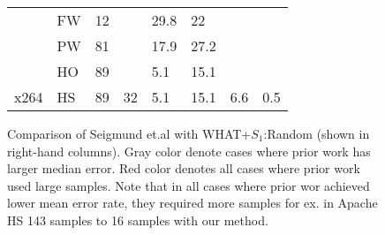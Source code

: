 \begin{figure*}[!t]
\begin{tabular}{|l|l|l|l|l|l|l|l|}
                                   & FW                              & 12                              &                                            & \cellcolor[HTML]{C0C0C0}29.8 & \cellcolor[HTML]{C0C0C0}22   &                       &                       \\ \cline{2-3} \cline{5-6}
                                   & PW                              & \cellcolor[HTML]{FD6864}81                              &                                            & \cellcolor[HTML]{C0C0C0}17.9 & \cellcolor[HTML]{C0C0C0}27.2 &                       &                       \\ \cline{2-3} \cline{5-6}
                                   & HO                              & \cellcolor[HTML]{FD6864}89                              &                                            & 5.1                          & 15.1                         &                       &                       \\ \cline{2-3} \cline{5-6}
\multirow{-4}{*}{x264}             & HS                              & \cellcolor[HTML]{FD6864}89                              & \multirow{-4}{*}{32}                       & 5.1                          & 15.1                         & \multirow{-4}{*}{6.6} & \multirow{-4}{*}{0.5} \\ \hline
\end{tabular}
\caption{Comparison of
Seigmund et.al \cite{siegmund2012predicting} with WHAT+$S_1$:Random 
(shown in right-hand columns). Gray color denote cases where prior work has larger median error. Red color denotes all cases where prior work used large samples. Note that in all cases where prior wor achieved lower mean error rate, they required more samples for ex. in Apache HS 143 samples to 16 samples with our method.
}\label{fig:vs2012}
\end{figure*}